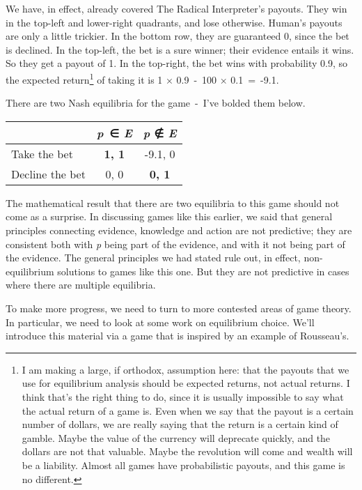\documentclass[
  10pt,
  letterpaper,
  DIV=11,
  numbers=noendperiod,
  twoside]{scrartcl}
\begin{document}
We have, in effect, already covered The Radical Interpreter's payouts.
They win in the top-left and lower-right quadrants, and lose otherwise.
Human's payouts are only a little trickier. In the bottom row, they are
guaranteed 0, since the bet is declined. In the top-left, the bet is a
sure winner; their evidence entails it wins. So they get a payout of 1.
In the top-right, the bet wins with probability 0.9, so the expected
return\footnote{I am making a large, if orthodox, assumption here: that
  the payouts that we use for equilibrium analysis should be expected
  returns, not actual returns. I think that's the right thing to do,
  since it is usually impossible to say what the actual return of a game
  is. Even when we say that the payout is a certain number of dollars,
  we are really saying that the return is a certain kind of gamble.
  Maybe the value of the currency will deprecate quickly, and the
  dollars are not that valuable. Maybe the revolution will come and
  wealth will be a liability. Almost all games have probabilistic
  payouts, and this game is no different.} of taking it is 1 × 0.9~-~100
× 0.1~=~-9.1.

There are two Nash equilibria for the game~-~I've bolded them below.

\begin{longtable}[]{@{}lcc@{}}
\toprule\noalign{}
& \emph{p}~∈ \emph{E} & \emph{p} ∉ \emph{E} \\
\midrule\noalign{}
\endhead
\bottomrule\noalign{}
\endlastfoot
Take the bet & \textbf{1, 1} & -9.1, 0 \\
Decline the bet & 0, 0 & \textbf{0, 1} \\
\end{longtable}

The mathematical result that there are two equilibria to this game
should not come as a surprise. In discussing games like this earlier, we
said that general principles connecting evidence, knowledge and action
are not predictive; they are consistent both with \emph{p} being part of
the evidence, and with it not being part of the evidence. The general
principles we had stated rule out, in effect, non-equilibrium solutions
to games like this one. But they are not predictive in cases where there
are multiple equilibria.

To make more progress, we need to turn to more contested areas of game
theory. In particular, we need to look at some work on equilibrium
choice. We'll introduce this material via a game that is inspired by an
example of Rousseau's.
\end{document}
